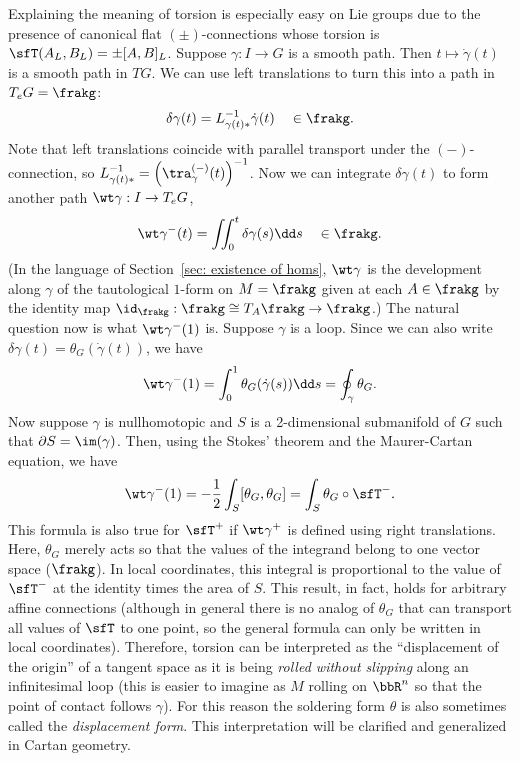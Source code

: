 \begin{example}
    Explaining the meaning of torsion is especially easy on Lie groups due to the presence of canonical flat $(\pm)$-connections whose torsion is $\sfT(A_L,B_L)=\pm [A,B]_L$. Suppose $\gamma:I\to G$ is a smooth path. Then $t\mapsto \dot\gamma(t)$ is a smooth path in $TG$. We can use left translations to turn this into a path in $T_e G=\frakg$:
    \[\delta \gamma(t)=L_{\gamma(t)\ast}^{-1}\dot\gamma(t)\quad \in \frakg.\]
    Note that left translations coincide with parallel transport under the $(-)$-connection, so $L_{\gamma(t)\ast}^{-1}=\left(\tra^{(-)}_{\gamma}(t)\right)^{-1}$. Now we can integrate $\delta\gamma(t)$ to form another path $\wt\gamma:I\to T_e G$,
    \[\wt\gamma^-(t)=\iint_0^t \delta\gamma(s)\dd s \quad \in \frakg.\]
    (In the language of Section~\ref{sec: existence of homs}, $\wt\gamma$ is the development along $\gamma$ of the tautological $1$-form on $M=\frakg$ given at each $A\in\frakg$ by the identity map $\id_{\frakg}:\frakg\cong T_A\frakg\to \frakg$.) The natural question now is what $\wt\gamma^-(1)$ is. Suppose $\gamma$ is a loop. Since we can also write $\delta\gamma(t)=\theta_G(\dot\gamma(t))$, we have
    \[\wt\gamma^-(1)=\int_0^1 \theta_G(\dot\gamma(s))\dd s=\oint_\gamma \theta_G.\]
    Now suppose $\gamma$ is nullhomotopic and $S$ is a 2-dimensional submanifold of $G$ such that $\partial S=\im(\gamma)$. Then, using the Stokes' theorem and the Maurer-Cartan equation, we have
    \[\wt\gamma^-(1)=-\frac12\int_S [\theta_G,\theta_G]=\int_S \theta_G\circ \sfT^-.\]
    This formula is also true for $\sfT^+$ if $\wt\gamma^+$ is defined using right translations. Here, $\theta_G$ merely acts so that the values of the integrand belong to one vector space ($\frakg$). In local coordinates, this integral is proportional to the value of $\sfT^-$ at the identity times the area of $S$. This result, in fact, holds for arbitrary affine connections (although in general there is no analog of $\theta_G$ that can transport all values of $\sfT$ to one point, so the general formula can only be written in local coordinates). Therefore, torsion can be interpreted as the ``displacement of the origin'' of a tangent space as it is being \emph{rolled without slipping} along an infinitesimal loop (this is easier to imagine as $M$ rolling on $\bbR^n$ so that the point of contact follows $\gamma$). For this reason the soldering form $\theta$ is also sometimes called the \emph{displacement form}. This interpretation will be clarified and generalized in Cartan geometry.
\end{example}







